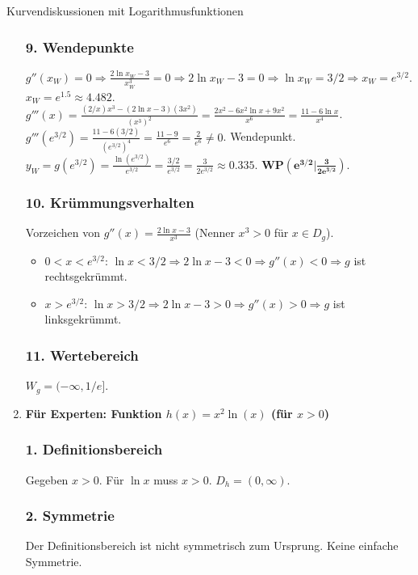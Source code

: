 \begin{loesungsumgebung}{Kurvendiskussionen mit Logarithmusfunktionen}
\begin{enumerate}[label=(\alph*)]
    \subsubsection*{9. Wendepunkte}
    $g''(x_W)=0 \Rightarrow \frac{2\ln x_W - 3}{x_W^3}=0 \Rightarrow 2\ln x_W - 3 = 0 \Rightarrow \ln x_W = 3/2 \Rightarrow x_W = e^{3/2}$.
    $x_W = e^{1.5} \approx 4.482$.
    $g'''(x) = \frac{(2/x)x^3 - (2\ln x - 3)(3x^2)}{(x^3)^2} = \frac{2x^2 - 6x^2\ln x + 9x^2}{x^6} = \frac{11-6\ln x}{x^4}$.
    $g'''(e^{3/2}) = \frac{11-6(3/2)}{(e^{3/2})^4} = \frac{11-9}{e^6} = \frac{2}{e^6} \neq 0$. Wendepunkt.
    $y_W = g(e^{3/2}) = \frac{\ln(e^{3/2})}{e^{3/2}} = \frac{3/2}{e^{3/2}} = \frac{3}{2e^{3/2}} \approx 0.335$.
    $\mathbf{WP(e^{3/2}|\frac{3}{2e^{3/2}})}$.

    \subsubsection*{10. Krümmungsverhalten}
    Vorzeichen von $g''(x)=\frac{2\ln x - 3}{x^3}$ (Nenner $x^3>0$ für $x \in D_g$).
    \begin{itemize}
        \item $0 < x < e^{3/2}$: $\ln x < 3/2 \Rightarrow 2\ln x - 3 < 0 \Rightarrow g''(x) < 0 \Rightarrow g$ ist rechtsgekrümmt.
        \item $x > e^{3/2}$: $\ln x > 3/2 \Rightarrow 2\ln x - 3 > 0 \Rightarrow g''(x) > 0 \Rightarrow g$ ist linksgekrümmt.
    \end{itemize}

    \subsubsection*{11. Wertebereich}
    $W_g = (-\infty, 1/e]$.

    \item \textbf{Für Experten: Funktion $h(x) = x^2 \ln(x)$ (für $x>0$)}

    \subsubsection*{1. Definitionsbereich}
    Gegeben $x>0$. Für $\ln x$ muss $x>0$.
    $D_h = (0, \infty)$.

    \subsubsection*{2. Symmetrie}
    Der Definitionsbereich ist nicht symmetrisch zum Ursprung. Keine einfache Symmetrie.


\end{enumerate}
\end{loesungsumgebung}
